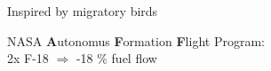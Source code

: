 \documentclass[12pt,svgnames,table,draft=false]{beamer}
\begin{document}
\begin{frame}{Inspired by migratory birds}

\end{frame}

\begin{frame}{}

\vspace{-8em}
\centering
\begin{tcolorbox}[width=.8\textwidth,colback={gray!10!}]  
\centering
NASA \textbf{A}utonomus \textbf{F}ormation \textbf{F}light Program: \\
2x F-18 $\Rightarrow$ -18 \% fuel flow  
\end{tcolorbox}  

\end{frame}
\end{document}
